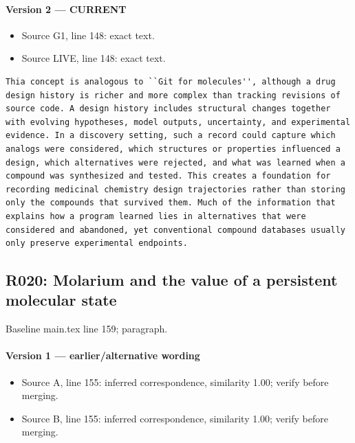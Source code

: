 \documentclass[11pt]{article}
\begin{document}
\paragraph{Version 2 --- CURRENT}

\begin{itemize}[leftmargin=*]
\item Source G1, line 148: exact text.
\item Source LIVE, line 148: exact text.
\end{itemize}

\begin{lstlisting}
Thia concept is analogous to ``Git for molecules'', although a drug design history is richer and more complex than tracking revisions of source code. A design history includes structural changes together with evolving hypotheses, model outputs, uncertainty, and experimental evidence. In a discovery setting, such a record could capture which analogs were considered, which structures or properties influenced a design, which alternatives were rejected, and what was learned when a compound was synthesized and tested. This creates a foundation for recording medicinal chemistry design trajectories rather than storing only the compounds that survived them. Much of the information that explains how a program learned lies in alternatives that were considered and abandoned, yet conventional compound databases usually only preserve experimental endpoints.
\end{lstlisting}

\subsection{R020: Molarium and the value of a persistent molecular state}

Baseline main.tex line 159; paragraph.

\paragraph{Version 1 --- earlier/alternative wording}

\begin{itemize}[leftmargin=*]
\item Source A, line 155: inferred correspondence, similarity 1.00; verify before merging.
\item Source B, line 155: inferred correspondence, similarity 1.00; verify before merging.
\end{itemize}
\end{document}
